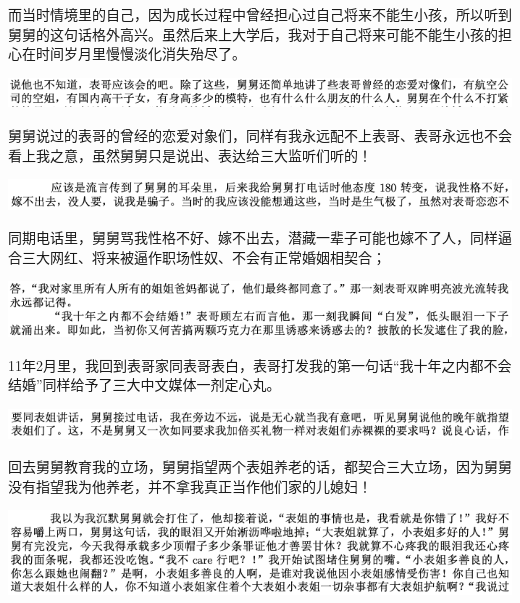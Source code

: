 \documentclass[9pt, b5paper]{article}
\begin{document}
而当时情境里的自己，因为成长过程中曾经担心过自己将来不能生小孩，所以听到舅舅的这句话格外高兴。虽然后来上大学后，我对于自己将来可能不能生小孩的担心在时间岁月里慢慢淡化消失殆尽了。 

\begin{center}
\includegraphics[width=.9\linewidth]{./pic/backups_plans_20210412_171125.png}
\end{center}

舅舅说过的表哥的曾经的恋爱对象们，同样有我永远配不上表哥、表哥永远也不会看上我之意，虽然舅舅只是说出、表达给三大监听们听的！

\begin{center}
\includegraphics[width=.9\linewidth]{./pic/backups_plans_20210412_171215.png}
\end{center}

同期电话里，舅舅骂我性格不好、嫁不出去，潜藏一辈子可能也嫁不了人，同样逼合三大网红、将来被逼作职场性奴、不会有正常婚姻相契合；

\begin{center}
\includegraphics[width=.9\linewidth]{./pic/backups_plans_20210412_171242.png}
\end{center}

11年2月里，我回到表哥家同表哥表白，表哥打发我的第一句话“我十年之内都不会结婚”同样给予了三大中文媒体一剂定心丸。

\begin{center}
\includegraphics[width=.9\linewidth]{./pic/backups_plans_20210412_171427.png}
\end{center}

回去舅舅教育我的立场，舅舅指望两个表姐养老的话，都契合三大立场，因为舅舅没有指望我为他养老，并不拿我真正当作他们家的儿媳妇！

\begin{center}
\includegraphics[width=.9\linewidth]{./pic/backups_plans_20210412_171555.png}
\end{center}
\end{document}
